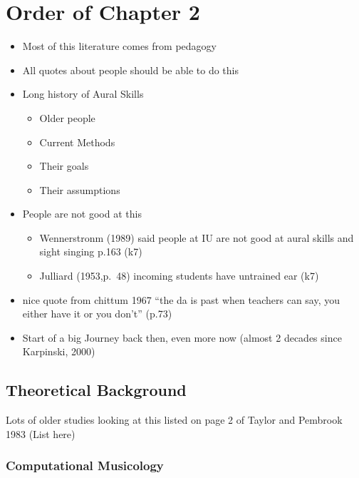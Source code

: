 \documentclass[]{book}
\providecommand{\tightlist}{%
  \setlength{\itemsep}{0pt}\setlength{\parskip}{0pt}}
\theoremstyle{definition}
\theoremstyle{definition}
\theoremstyle{definition}
\theoremstyle{remark}
\begin{document}
\hypertarget{order-of-chapter-2}{%
\section{Order of Chapter 2}\label{order-of-chapter-2}}

\begin{itemize}
\tightlist
\item
  Most of this literature comes from pedagogy
\item
  All quotes about people should be able to do this
\item
  Long history of Aural Skills

  \begin{itemize}
  \tightlist
  \item
    Older people
  \item
    Current Methods
  \item
    Their goals
  \item
    Their assumptions
  \end{itemize}
\item
  People are not good at this

  \begin{itemize}
  \tightlist
  \item
    Wennerstronm (1989) said people at IU are not good at aural skills
    and sight singing p.163 (k7)
  \item
    Julliard (1953,p.~48) incoming students have untrained ear (k7)
  \end{itemize}
\item
  nice quote from chittum 1967 ``the da is past when teachers can say,
  you either have it or you don't'' (p.73)
\item
  Start of a big Journey back then, even more now (almost 2 decades
  since Karpinski, 2000)
\end{itemize}

\hypertarget{theoretical-background}{%
\subsection{Theoretical Background}\label{theoretical-background}}

Lots of older studies looking at this listed on page 2 of Taylor and
Pembrook 1983 (List here)

\hypertarget{computational-musicology}{%
\subsubsection{Computational
Musicology}\label{computational-musicology}}
\end{document}
